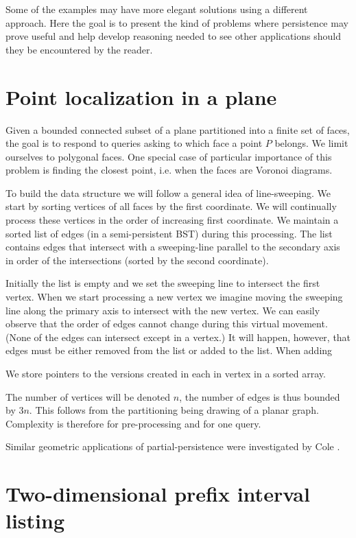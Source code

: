 Some of the examples may have more elegant solutions using a different approach. Here the goal is to present the kind of problems where persistence may prove useful and help develop reasoning needed to see other applications should they be encountered by the reader.

\section{Point localization in a plane}

Given a bounded connected subset of a plane partitioned into a finite set of faces, the goal is to respond to queries asking to which face a point $P$ belongs. We limit ourselves to polygonal faces.
One special case of particular importance of this problem is finding the closest point, i.e. when the faces are Voronoi diagrams.

To build the data structure we will follow a general idea of line-sweeping. We start by sorting vertices of all faces by the first coordinate. We will continually process these vertices in the order of increasing first coordinate. We maintain a sorted list of edges (in a semi-persistent BST) during this processing. The list contains edges that intersect with a sweeping-line parallel to the secondary axis in order of the intersections (sorted by the second coordinate). 

Initially the list is empty and we set the sweeping line to intersect the first vertex.
When we start processing a new vertex we imagine moving the sweeping line along the primary axis to intersect with the new vertex. We can easily observe that the order of edges cannot change during this virtual movement. (None of the edges can intersect except in a vertex.) It will happen, however, that edges must be either removed from the list or added to the list. When adding 

We store pointers to the versions created in each in vertex in a sorted array.

The number of vertices will be denoted $n$, the number of edges is thus bounded by $3n$. This follows from the partitioning being drawing of a planar graph. Complexity is therefore  for pre-processing and  for one query.

Similar geometric applications of partial-persistence were investigated by Cole \cite{geometric-applications}.




\section{Two-dimensional prefix interval listing}

